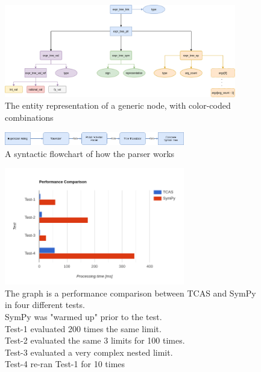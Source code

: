\documentclass{article}
\theoremstyle{plain}
\theoremstyle{definition}
\theoremstyle{algorithm}
\begin{document}
	\begin{figure}
		\centering
		\includegraphics[width=0.9\textwidth]{chart/expr_structs.PNG}
		\caption{The entity representation of a generic node, with color-coded combinations} \label{fig:expr_structs}
	\end{figure}

	\begin{figure}
		\centering
		\includegraphics[width=0.7\textwidth]{chart/parser.PNG}
		\caption{A syntactic flowchart of how the parser works} \label{fig:parser}
	\end{figure}

    \begin{figure}
		\centering
		\includegraphics[width=0.7\textwidth]{img/performance_graph.PNG}
		\caption{The graph is a performance comparison between TCAS and SymPy in four different tests.\\SymPy was "warmed up" prior to the test.\\Test-1 evaluated 200 times the same limit.\\Test-2 evaluated the same 3 limits for 100 times.\\Test-3 evaluated a very complex nested limit.\\Test-4 re-ran Test-1 for 10 times} \label{fig:performance_graph}  
	\end{figure}

	
	
\end{document}
